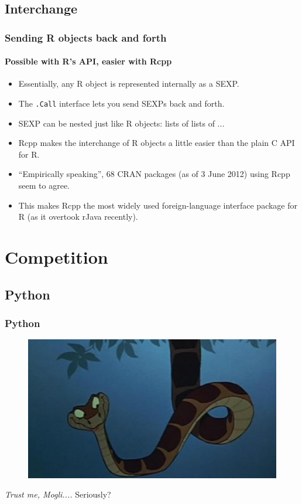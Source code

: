\documentclass[dvipsnames,handout,compress,pdflatex,beamer]{beamer}
\begin{document}
\subsection{Interchange}
\begin{frame}
  \frametitle{Sending R objects back and forth}
  \framesubtitle{Possible with R's API, easier with Rcpp}
  \begin{itemize}[<+->]
  \item Essentially, any R object is represented internally as a SEXP.
  \item The \texttt{.Call} interface lets you send SEXPs back and forth.
  \item SEXP can be nested just like R objects: lists of lists of ...
  \item Rcpp makes the interchange of R objects a little easier than the
    plain C API for R. 
  \item ``Empirically speaking'', 68 CRAN packages (as
    of 3 June 2012) using Rcpp seem to agree.
  \item This makes Rcpp the most widely used foreign-language interface
    package for R (as it overtook rJava recently). 
  \end{itemize}
\end{frame}

\iffalse
\section{Competition}

\subsection{Python}
\begin{frame}
  \frametitle{Python}
  \pause

  \begin{figure}
    \includegraphics[scale=0.6]{images/jungle-book-kaa.jpg}
  \end{figure}

  \smallskip
  
  \pause
  \emph{Trust me, Mogli....}   Seriously?
\end{frame}
\end{document}
